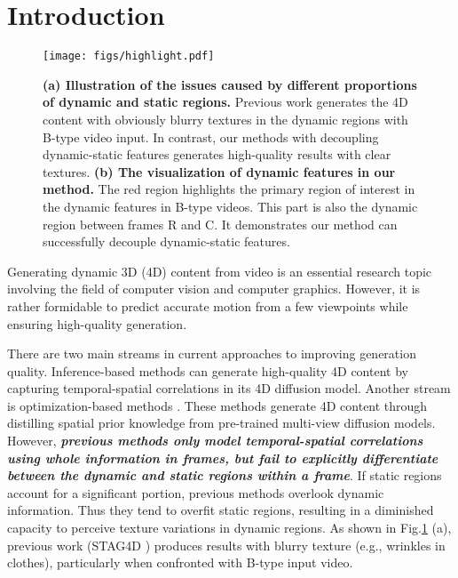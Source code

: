 \section{Introduction} \label{intro}

\begin{figure}[t]
\centering
\texttt{[image: figs/highlight.pdf]}
\caption{\textbf{(a) Illustration of the issues caused by different proportions of dynamic and static regions.} Previous work \cite{zeng2024stag4d} generates the 4D content with obviously blurry textures in the dynamic regions with B-type video input. In contrast, our methods with decoupling dynamic-static features generates high-quality results with clear textures. \textbf{(b) The visualization of dynamic features in our method.} The red region highlights the primary region of interest in the dynamic features in B-type videos. This part is also the dynamic region between frames R and C. It demonstrates our method can successfully decouple dynamic-static features.}\label{highlight}
\end{figure}


Generating dynamic 3D (4D) content  \cite{li2022neural,shao2023tensor4d,li2021neural,pumarola2021d,park2021hypernerf,gao2022monocular,li2024dreammesh4d,wu20244d} from video is an essential research topic involving the field of computer vision and computer graphics. However, it is rather formidable to predict accurate motion from a few viewpoints while ensuring high-quality generation.

There are two main streams in current approaches to improving generation quality. Inference-based methods \cite{xie2024sv4d,zhang20244diffusion,ren2024l4gm,liang2024diffusion4d} can generate high-quality 4D content by capturing temporal-spatial correlations in its 4D diffusion model. Another stream is optimization-based methods \cite{singer2023text,zeng2024stag4d,yin20234dgen,wu2024sc4d}. These methods generate 4D content through distilling spatial prior knowledge from pre-trained multi-view \cite{liu2023zero,shi2023zero123++} diffusion models. However, \textbf{\textit{previous methods only model temporal-spatial correlations using whole information in frames, but fail to explicitly differentiate between the dynamic and static regions within a frame}}. If static regions account for a significant portion, previous methods overlook dynamic information. Thus they tend to overfit static regions, resulting in a diminished capacity to perceive texture variations in dynamic regions. As shown in Fig.\ref{highlight} (a), previous work (STAG4D \cite{zeng2024stag4d}) produces results with blurry texture (e.g., wrinkles in clothes), particularly when confronted with B-type input video. 

